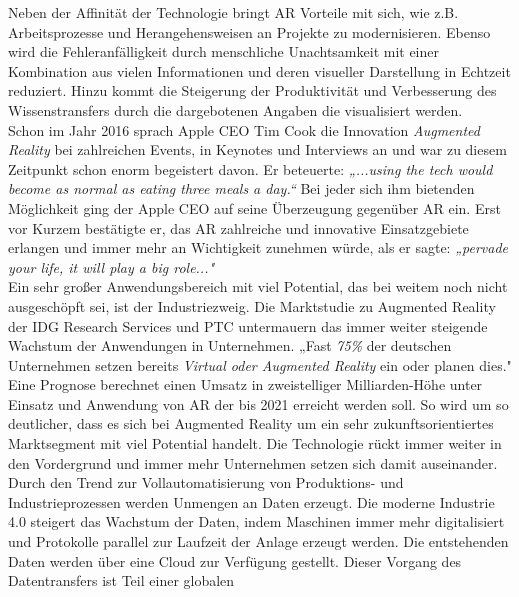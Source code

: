 Neben der Affinität der Technologie bringt \acs{AR} Vorteile mit sich, wie z.B. Arbeitsprozesse und Herangehensweisen an Projekte zu 
modernisieren. Ebenso wird die Fehleranfälligkeit durch menschliche Unachtsamkeit mit einer Kombination aus vielen Informationen und 
deren visueller Darstellung in Echtzeit reduziert. Hinzu kommt die Steigerung der Produktivität und Verbesserung des Wissenstransfers 
durch die dargebotenen Angaben die visualisiert werden.
\\ 
\linebreak
Schon im Jahr 2016 sprach Apple CEO Tim Cook die Innovation \textit{Augmented Reality} bei zahlreichen Events, in Keynotes und Interviews 
an und war zu diesem Zeitpunkt schon enorm begeistert davon. Er beteuerte: \textit{„...using the tech would become as normal as eating three 
meals a day.“} \cite{timcook2016.2016o} Bei jeder sich ihm bietenden Möglichkeit ging der Apple CEO auf seine Überzeugung gegenüber \acl{AR} ein. 
Erst vor Kurzem bestätigte er, das \acs{AR} zahlreiche und innovative Einsatzgebiete erlangen und immer mehr an Wichtigkeit zunehmen 
würde, als er sagte: \textit{„pervade your life, it will play a big role..."} \cite{timcook.2020j} 
\\ 
\linebreak
Ein sehr großer Anwendungsbereich mit viel Potential, das bei weitem noch nicht ausgeschöpft sei, ist der Industriezweig. Die 
Marktstudie zu Augmented Reality der IDG Research Services und PTC untermauern das immer weiter steigende Wachstum der Anwendungen in 
Unternehmen. „Fast \textit{75\%} der deutschen Unternehmen setzen bereits \textit{Virtual oder Augmented Reality} ein oder planen dies." 
\cite{studieptc.2020j} Eine Prognose berechnet einen Umsatz in zweistelliger Milliarden-Höhe unter Einsatz und Anwendung von \acs{AR} der 
bis 2021 erreicht werden soll. So wird um so deutlicher, dass es sich bei Augmented Reality um ein sehr zukunftsorientiertes Marktsegment 
mit viel Potential handelt. Die Technologie rückt immer weiter in den Vordergrund und immer mehr Unternehmen setzen sich damit auseinander.
\\ 
\linebreak
Durch den Trend zur Vollautomatisierung von Produktions- und Industrieprozessen werden Unmengen an Daten erzeugt. Die moderne Industrie 4.0 
steigert das Wachstum der Daten, indem Maschinen immer mehr digitalisiert und Protokolle parallel zur Laufzeit der Anlage erzeugt werden. 
Die entstehenden Daten werden über eine Cloud zur Verfügung gestellt. Dieser Vorgang des Datentransfers ist Teil einer globalen 
